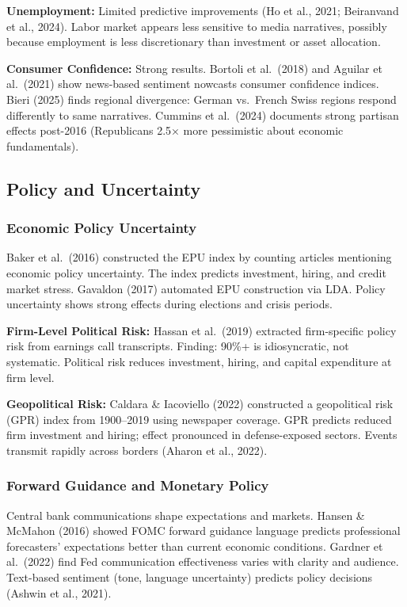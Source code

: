 \documentclass[12pt,a4paper]{article}
\begin{document}
\textbf{Unemployment:} Limited predictive improvements (Ho et al., 2021; Beiranvand et al., 2024). Labor market appears less sensitive to media narratives, possibly because employment is less discretionary than investment or asset allocation.

\textbf{Consumer Confidence:} Strong results. Bortoli et al.\ (2018) and Aguilar et al.\ (2021) show news-based sentiment nowcasts consumer confidence indices. Bieri (2025) finds regional divergence: German vs.\ French Swiss regions respond differently to same narratives. Cummins et al.\ (2024) documents strong partisan effects post-2016 (Republicans 2.5× more pessimistic about economic fundamentals).

\subsection{Policy and Uncertainty}
\label{subsec:policy}

\subsubsection{Economic Policy Uncertainty}

Baker et al.\ (2016) constructed the EPU index by counting articles mentioning economic policy uncertainty. The index predicts investment, hiring, and credit market stress. Gavaldon (2017) automated EPU construction via LDA. Policy uncertainty shows strong effects during elections and crisis periods.

\textbf{Firm-Level Political Risk:} Hassan et al.\ (2019) extracted firm-specific policy risk from earnings call transcripts. Finding: 90\%+ is idiosyncratic, not systematic. Political risk reduces investment, hiring, and capital expenditure at firm level.

\textbf{Geopolitical Risk:} Caldara \& Iacoviello (2022) constructed a geopolitical risk (GPR) index from 1900--2019 using newspaper coverage. GPR predicts reduced firm investment and hiring; effect pronounced in defense-exposed sectors. Events transmit rapidly across borders (Aharon et al., 2022).

\subsubsection{Forward Guidance and Monetary Policy}

Central bank communications shape expectations and markets. Hansen \& McMahon (2016) showed FOMC forward guidance language predicts professional forecasters' expectations better than current economic conditions. Gardner et al.\ (2022) find Fed communication effectiveness varies with clarity and audience. Text-based sentiment (tone, language uncertainty) predicts policy decisions (Ashwin et al., 2021).
\end{document}
